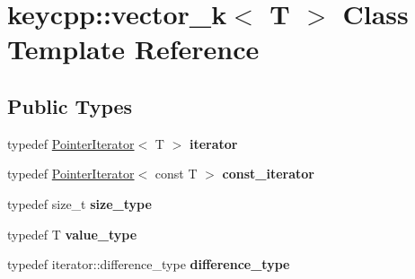 \hypertarget{classkeycpp_1_1vector__k}{\section{keycpp\-:\-:vector\-\_\-k$<$ T $>$ Class Template Reference}
\label{classkeycpp_1_1vector__k}
}
\subsection*{Public Types}
\begin{DoxyCompactItemize}
\item 
\hypertarget{classkeycpp_1_1vector__k_a0c53a4d249da380a1eec01c56176de9c}{typedef \hyperlink{classkeycpp_1_1_pointer_iterator}{Pointer\-Iterator}$<$ T $>$ {\bfseries iterator}}\label{classkeycpp_1_1vector__k_a0c53a4d249da380a1eec01c56176de9c}

\item 
\hypertarget{classkeycpp_1_1vector__k_a7f0415773f7c1b1cac7699d141ed1d3b}{typedef \hyperlink{classkeycpp_1_1_pointer_iterator}{Pointer\-Iterator}$<$ const T $>$ {\bfseries const\-\_\-iterator}}\label{classkeycpp_1_1vector__k_a7f0415773f7c1b1cac7699d141ed1d3b}

\item 
\hypertarget{classkeycpp_1_1vector__k_a66a8ed8296d754341cedd8b242fc980a}{typedef size\-\_\-t {\bfseries size\-\_\-type}}\label{classkeycpp_1_1vector__k_a66a8ed8296d754341cedd8b242fc980a}

\item 
\hypertarget{classkeycpp_1_1vector__k_abc7ae2bed19ed75dccc2f0aa57af689e}{typedef T {\bfseries value\-\_\-type}}\label{classkeycpp_1_1vector__k_abc7ae2bed19ed75dccc2f0aa57af689e}

\item 
\hypertarget{classkeycpp_1_1vector__k_aae155cf6b11b7c611b461db5b8b5bee2}{typedef iterator\-::difference\-\_\-type {\bfseries difference\-\_\-type}}\label{classkeycpp_1_1vector__k_aae155cf6b11b7c611b461db5b8b5bee2}

\end{DoxyCompactItemize}

